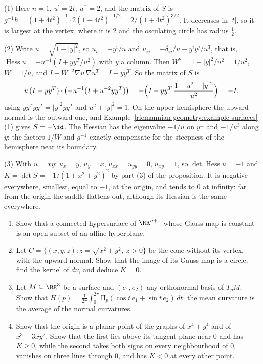 \begin{solution}
(1) Here $n = 1$, $u^{\prime} = 2t$, $u^{\prime\prime} = 2$, and the matrix of $S$ is $g^{-1}h = (1 + 4t^2)^{-1}\cdot 2(1 + 4t^2)^{-1/2} = 2/(1 + 4t^2)^{3/2}$. It decreases in $|t|$, so it is largest at the vertex,
where it is $2$ and the osculating circle has radius $\frac12$.

(2) Write $u = \sqrt{1 - |y|^2}$, so $u_i = -y^i/u$ and $u_{ij} = -\delta_{ij}/u - y^iy^j/u^3$, that is, $\operatorname{Hess}u = -u^{-1}(I + yy^T/u^2)$ with $y$ a column. Then
$W^2 = 1 + |y|^2/u^2 = 1/u^2$, $W = 1/u$, and $I - W^{-2}\nabla u\,\nabla u^T = I - yy^T$. So the matrix of $S$ is
\[
u\,(I - yy^T)\cdot\bigl(-u^{-1}(I + u^{-2}yy^T)\bigr) = -\Bigl(I + yy^T\,\frac{1 - u^2 - |y|^2}{u^2}\Bigr) = -I ,
\]
using $yy^Tyy^T = |y|^2yy^T$ and $u^2 + |y|^2 = 1$. On the upper hemisphere the upward normal is the outward one, and Example~\ref{riemannian-geometry:example-surfaces}(1) gives $S = -\id$. The Hessian has the
eigenvalue $-1/u$ on $y^\perp$ and $-1/u^3$ along $y$; the factors $1/W$ and $g^{-1}$ exactly compensate for the steepness of the hemisphere near its boundary.

(3) With $u = xy$: $u_x = y$, $u_y = x$, $u_{xx} = u_{yy} = 0$, $u_{xy} = 1$, so $\det\operatorname{Hess}u = -1$ and $K = \det S = -1/(1 + x^2 + y^2)^2$ by part (3) of the proposition. It is negative
everywhere, smallest, equal to $-1$, at the origin, and tends to $0$ at infinity: far from the origin the saddle flattens out, although its Hessian is the same everywhere.
\end{solution}

\begin{exercise}\label{riemannian-geometry:exercise-gauss-map}
\begin{enumerate}
\item Show that a connected hypersurface of $\RR^{n+1}$ whose Gauss map is constant is an open subset of an affine hyperplane.
\item Let $C = \{(x, y, z) : z = \sqrt{x^2 + y^2},\ z > 0\}$ be the cone without its vertex, with the upward normal. Show that the image of its Gauss map is a circle, find the kernel of $d\nu$, and deduce
$K = 0$.
\item Let $M \subseteq \RR^3$ be a surface and $(e_1, e_2)$ any orthonormal basis of $T_pM$. Show that $H(p) = \frac{1}{2\pi}\int_0^{2\pi}\mathrm{II}_p(\cos t\,e_1 + \sin t\,e_2)\,dt$: the mean curvature is
the average of the normal curvatures.
\item Show that the origin is a planar point of the graphs of $x^4 + y^4$ and of $x^3 - 3xy^2$. Show that the first lies above its tangent plane near $0$ and has $K \geq 0$, while the second takes both signs
on every neighbourhood of $0$, vanishes on three lines through $0$, and has $K < 0$ at every other point.
\end{enumerate}
\end{exercise}

